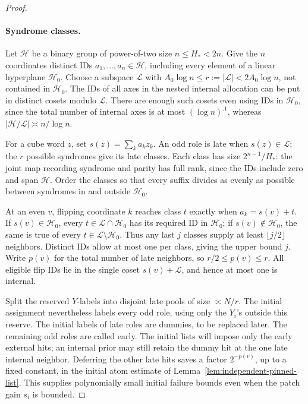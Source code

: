 \begin{proof}\leavevmode\par
\paragraph{Syndrome classes.}
Let \(\mathcal H\) be a binary group of power-of-two size
\(n\le H_*<2n\). Give the \(n\) coordinates distinct IDs
\(a_1,\ldots,a_n\in\mathcal H\), including every element of a linear
hyperplane \(\mathcal H_0\). Choose a subspace \(\mathcal L\) with
\(A_0\log n\le r:=|\mathcal L|<2A_0\log n\), not contained in
\(\mathcal H_0\). The IDs of all axes in the nested internal allocation
can be put in distinct cosets modulo \(\mathcal L\). There are enough
such cosets even using IDs in \(\mathcal H_0\), since the total number of
internal axes is at most \((\log n)^{.1}\), whereas
\(|\mathcal H/\mathcal L|\asymp n/\log n\).

For a cube word \(z\), set \(s(z)=\sum_k a_kz_k\). An odd role is late
when \(s(z)\in\mathcal L\); the \(r\) possible syndromes give its late
classes. Each class has size \(2^{n-1}/H_*\): the joint map recording
syndrome and parity has full rank, since the IDs include zero and span
\(\mathcal H\). Order the classes so that every suffix divides as evenly
as possible between syndromes in and outside \(\mathcal H_0\).

At an even \(v\), flipping coordinate \(k\) reaches class \(t\) exactly
when \(a_k=s(v)+t\). If \(s(v)\in\mathcal H_0\), every
\(t\in\mathcal L\cap\mathcal H_0\) has its required ID in
\(\mathcal H_0\); if \(s(v)\notin\mathcal H_0\), the same is true of
every \(t\in\mathcal L\setminus\mathcal H_0\). Thus any last \(j\)
classes supply at least \(\lfloor j/2\rfloor\) neighbors. Distinct IDs
allow at most one per class, giving the upper bound \(j\). Write
\(p(v)\) for the total number of late neighbors, so \(r/2\le p(v)\le r\).
All eligible flip IDs lie in the single coset \(s(v)+\mathcal L\), and
hence at most one is internal.

Split the reserved \(Y\)-labels into disjoint late pools of size
\(\asymp N/r\). The initial assignment nevertheless labels every odd
role, using only the \(Y_i\)'s outside this reserve. The initial labels
of late roles are dummies, to be replaced later. The remaining odd roles
are called early. The initial lists will impose only the early external
hits; an internal prior may still retain the dummy hit at the one late
internal neighbor. Deferring the other late hits saves a factor
\(2^{-p(v)}\), up to a fixed constant, in the initial atom estimate
of Lemma~\ref{lem:independent-pinned-list}. This supplies polynomially
small initial failure bounds even when the patch gain \(s_i\) is bounded.


\end{proof}
